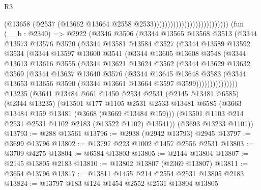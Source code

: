\begin{lexlean}{R3}
\begin{coremodule}
                                                    (@13658
                                                      (@2537
                                                        (@13662
                                                          @13664
                                                          @2558
                                                          @2533)))))))))))))))))))))))))))
    (fun (__b : @2340) =>
    @2922
      (@3346
        @3506
        (@3344
          @13565
          @13568
          @3513
          (@3344
            @13573
            @13576
            @3520
            (@3344
              @13581
              @13584
              @3527
              (@3344
                @13589
                @13592
                @3534
                (@3344
                  @13597
                  @13600
                  @3541
                  (@3344
                    @13605
                    @13608
                    @3548
                    (@3344
                      @13613
                      @13616
                      @3555
                      (@3344
                        @13621
                        @13624
                        @3562
                        (@3344
                          @13629
                          @13632
                          @3569
                          (@3344
                            @13637
                            @13640
                            @3576
                            (@3344
                              @13645
                              @13648
                              @3583
                              (@3344
                                @13653
                                @13656
                                @3590
                                (@3344 @13661 @13664 @3597 @3599)))))))))))))))
    @13235
    (@3641
      @13484
      @661
      @1450
      @2534
      @2531
      (@2145 @13481 @6585)
      (@2344 @13235)
      (@13501
        @177
        @1105
        @2531
        @2533
        @13481
        @6585
        (@3663 @13484 @159 @13481 (@3668 (@3669 @13484 @159)))
        (@13501 @1103 @214 @2531 @2531 @1102 @2183 (@13522 @1102) @13541))
      (@3693 @13233 @1101))
@13793 := @288 @13561
@13796 := @2938 (@2942 @13793) @2945
@13797 := @3699 @13796
@13802 := @13797 @223 @1002 @1457 @2556 @2531
@13803 := @3709 @4275
@13804 := @6584 @13803
@13805 := @2144 @13804
@13807 := @2145 @13805 @2183
@13810 := @13802 @13807 (@2369 @13807)
@13811 := @3654 @13796
@13817 := @13811 @1455 @214 @2554 @2531 @13805 @2183
@13824 := @13797 @183 @124 @1454 @2552 @2531 @13804 @13805

\end{coremodule}
\end{lexlean}
